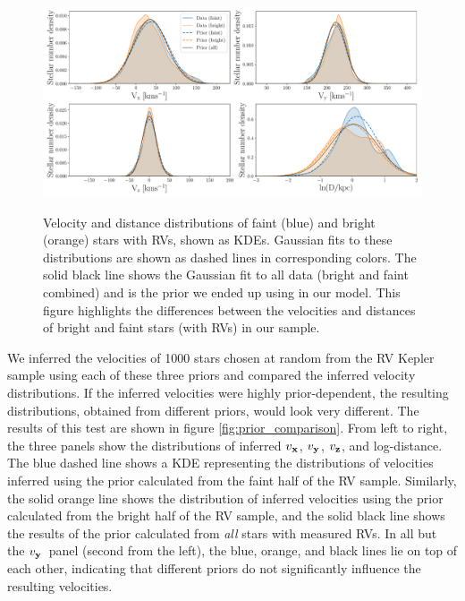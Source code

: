 \documentclass[]{aastex631}
\newcommand{\vx}{$v_{\bf x}$}
\newcommand{\vy}{$v_{\bf y}$}
\newcommand{\vz}{$v_{\bf z}$}
\begin{document}
\begin{figure}[ht!]
\caption{
    Velocity and distance distributions of faint (blue) and bright (orange)
    stars with RVs, shown as KDEs.
    Gaussian fits to these distributions are shown as dashed lines in
    corresponding colors.
    The solid black line shows the Gaussian fit to all data (bright and faint
    combined) and is the prior we ended up using in our model.
    This figure highlights the differences between the velocities and
    distances of bright and faint stars (with RVs) in our sample.
}
  \centering
    \includegraphics[width=1\textwidth]{prior_distributions}
\label{fig:prior_distributions}
\end{figure}
We inferred the velocities of 1000 stars chosen at random from the
RV Kepler sample using each of these three priors and compared the
inferred velocity distributions.
If the inferred velocities were highly prior-dependent, the resulting
distributions, obtained from different priors, would look very different.
The results of this test are shown in figure \ref{fig:prior_comparison}.
From left to right, the three panels show the distributions of inferred \vx,
\vy, \vz, and log-distance.
The blue dashed line shows a KDE representing the distributions of velocities
inferred using the prior calculated from the faint half of the RV sample.
Similarly, the solid orange line shows the distribution of inferred velocities
using the prior calculated from the bright half of the RV sample, and the
solid black line shows the results of the prior calculated from {\it all}
stars with measured RVs.
In all but the \vy\ panel (second from the left), the blue, orange,
and black lines lie on top of each other, indicating that different priors do
not significantly influence the resulting velocities.
\end{document}
